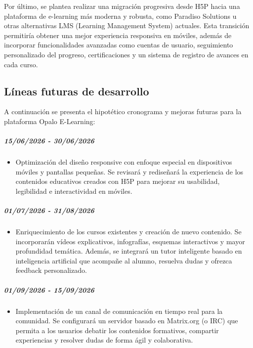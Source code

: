 \documentclass[11.5pt]{article}
\begin{document}
	Por último, se plantea realizar una migración progresiva desde H5P hacia una plataforma de e-learning más moderna y robusta, como Paradiso Solutions u otras alternativas LMS (Learning Management System) actuales. Esta transición permitiría obtener una mejor experiencia responsiva en móviles, además de incorporar funcionalidades avanzadas como cuentas de usuario, seguimiento personalizado del progreso, certificaciones y un sistema de registro de avances en cada curso.
	
	\subsection{Líneas futuras de desarrollo}
	
	A continuación se presenta el hipotético cronograma y mejoras futuras para la plataforma Opalo E-Learning:
	
	\noindent\subparagraph*{15/06/2026 - 30/06/2026}

	\begin{itemize}
		\item Optimización del diseño responsive con enfoque especial en dispositivos móviles y pantallas pequeñas. Se revisará y rediseñará la experiencia de los contenidos educativos creados con H5P para mejorar su usabilidad, legibilidad e interactividad en móviles.
	\end{itemize}
	
	\noindent\subparagraph*{01/07/2026 - 31/08/2026}
	
	\begin{itemize}
		\item Enriquecimiento de los cursos existentes y creación de nuevo contenido. Se incorporarán vídeos explicativos, infografías, esquemas interactivos y mayor profundidad temática. Además, se integrará un tutor inteligente basado en inteligencia artificial que acompañe al alumno, resuelva dudas y ofrezca feedback personalizado.
	\end{itemize}
	
	\noindent\subparagraph*{01/09/2026 - 15/09/2026}
	
	\begin{itemize}
		\item Implementación de un canal de comunicación en tiempo real para la comunidad. Se configurará un servidor basado en Matrix.org (o IRC) que permita a los usuarios debatir los contenidos formativos, compartir experiencias y resolver dudas de forma ágil y colaborativa.
	\end{itemize}
	
\end{document}
